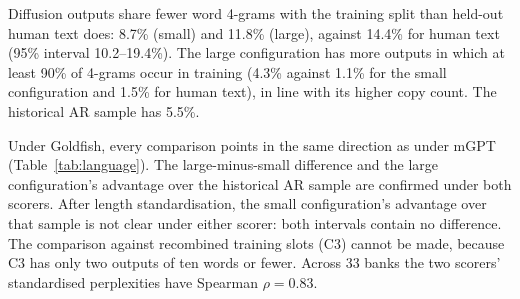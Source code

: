 \documentclass[11pt,a4paper]{article}
\begin{document}
Diffusion outputs share fewer word 4-grams with the training split than held-out human text does: 8.7\% (small) and 11.8\% (large), against 14.4\% for human text (95\% interval 10.2--19.4\%). The large configuration has more outputs in which at least 90\% of 4-grams occur in training (4.3\% against 1.1\% for the small configuration and 1.5\% for human text), in line with its higher copy count. The historical AR sample has 5.5\%.

Under Goldfish, every comparison points in the same direction as under mGPT (Table~\ref{tab:language}). The large-minus-small difference and the large configuration's advantage over the historical AR sample are confirmed under both scorers. After length standardisation, the small configuration's advantage over that sample is not clear under either scorer: both intervals contain no difference. The comparison against recombined training slots (C3) cannot be made, because C3 has only two outputs of ten words or fewer. Across 33 banks the two scorers' standardised perplexities have Spearman $\rho = 0.83$.
\end{document}
